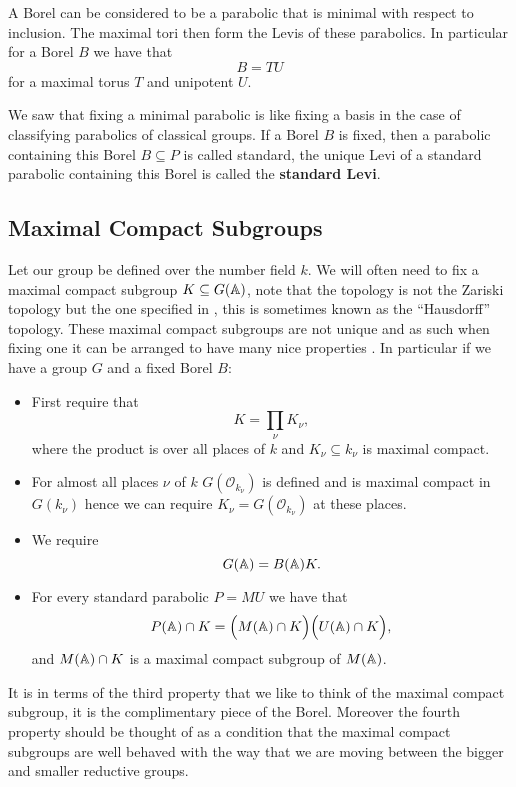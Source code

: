     A Borel can be considered to be a parabolic that is minimal with respect to inclusion. The maximal tori then form the Levis of these parabolics. In particular for a Borel \(B\) we have that 
    \[B = TU\]
    for a maximal torus \(T\) and unipotent \(U\).

    We saw that fixing a minimal parabolic is like fixing a basis in the case of classifying parabolics of classical groups. If a Borel \(B\) is fixed, then a parabolic containing this Borel \(B\subseteq P\) is called standard, the unique Levi of a standard parabolic containing this Borel is called the \textbf{standard Levi}.

    \subsection{Maximal Compact Subgroups}\label{max_compact_subgroup}
    Let our group be defined over the number field \(k\). We will often need to fix a maximal compact subgroup \(K\subseteq G(\A)\), note that the topology is not the Zariski topology but the one specified in \cite{conradWeilGrothendieckApproaches2012}, this is sometimes known as the ``Hausdorff'' topology. These maximal compact subgroups are not unique and as such when fixing one it can be arranged to have many nice properties \cite[I.1.4]{moeglinSpectralDecompositionEisenstein1995}. In particular if we have a group \(G\) and a fixed Borel \(B\):
    \begin{itemize}
        \item First require that 
        \[K = \prod_\nu K_\nu,\]
        where the product is over all places of \(k\) and \(K_\nu\subseteq k_\nu\) is maximal compact. 
        \item For almost all places \(\nu\) of \(k\) \(G(\mathcal{O}_{k_\nu})\) is defined and is maximal compact in \(G(k_\nu)\) hence we can require \(K_\nu = G(\mathcal{O}_{k_\nu})\) at these places. 
        \item We require 
        \[G(\A) = B(\A)K.\]
        \item For every standard parabolic \(P = MU\) we have that 
        \[P(\A)\cap K = \Bigl( M(\A)\cap K \Bigr) \Bigl( U(\A)\cap K \Bigr),\]
        and \(M(\A)\cap K\) is a maximal compact subgroup of \(M(\A)\).
    \end{itemize}
     It is in terms of the third property that we like to think of the maximal compact subgroup, it is the complimentary piece of the Borel. Moreover the fourth property should be thought of as a condition that the maximal compact subgroups are well behaved with the way that we are moving between the bigger and smaller reductive groups.
    

